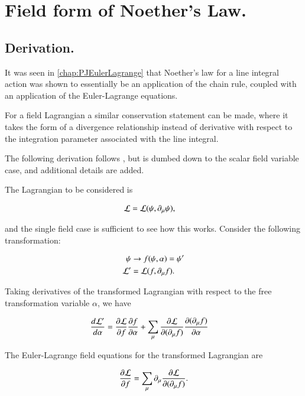 \chapter{Field form of Noether's Law.}\label{chap:PJNoethersField}
\date{ October 29, 2008.  Last Revision: $Date: 2009/06/04 13:13:27 $ }

\section{Derivation. }

It was seen in 
\ref{chap:PJEulerLagrange} 
that Noether's law for a line integral action was shown
to essentially be an application of the chain rule, coupled with
an application of the Euler-Lagrange equations.

For a field Lagrangian a similar conservation statement can be made, where
it takes the form of a divergence relationship instead of derivative
with respect to the integration parameter associated with the line integral.

The following derivation follows \cite{doran2003gap}, but is dumbed down to the scalar field variable case, and
additional details are added.

The Lagrangian to be considered is

\begin{align*}
\mathcal{L} &= \mathcal{L}(\psi, \partial_\mu \psi),
\end{align*}

and the single field case is sufficient to see how this works.  Consider the following transformation:

\begin{align*}
\psi &\rightarrow f(\psi, \alpha) = \psi' \\
\mathcal{L}' &= \mathcal{L}(f, \partial_\mu f).
\end{align*}

Taking derivatives of the transformed Lagrangian with respect to the free transformation variable $\alpha$, we have

\begin{align}\label{eqn:noetherField:noetherschain}
\frac{d\mathcal{L}'}{d\alpha}
&= \frac{\partial {\mathcal{L}}}{\partial {f}}\frac{\partial {f}}{\partial {\alpha}} + \sum_\mu \frac{\partial {\mathcal{L}}}{\partial {(\partial_\mu f)}}\frac{\partial {(\partial_\mu f)}}{\partial {\alpha}}
\end{align}

The Euler-Lagrange field equations for the transformed Lagrangian are

\begin{align}\label{eqn:noetherField:eulerLag}
\frac{\partial {\mathcal{L}}}{\partial {f}} = \sum_\mu \partial_\mu \frac{\partial {\mathcal{L}}}{\partial {(\partial_\mu f)}}.
\end{align}

